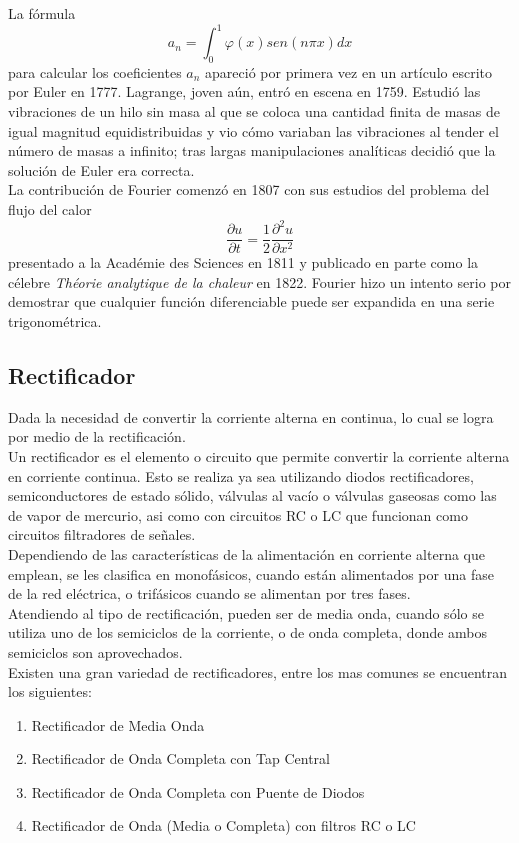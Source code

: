 \documentclass[a4paper,12pt]{article}
\begin{document}
\indent La fórmula
\[ a_n = \int_0^1 \varphi(x)sen\left(n\pi x\right)dx \]
para calcular los coeficientes $a_n$ apareció por primera vez en un artículo escrito por Euler en 1777.
\indent Lagrange, joven aún, entró en escena en 1759. Estudió las vibraciones de un hilo sin masa al que se coloca una cantidad finita de masas de igual magnitud equidistribuidas y vio cómo variaban las vibraciones al tender el
número de masas a infinito; tras largas manipulaciones analíticas decidió que la solución de Euler era correcta.\\
\indent La contribución de Fourier comenzó en 1807 con sus estudios del problema
del flujo del calor
\[ \frac{\partial u}{\partial t} = \frac{1}{2}\frac{\partial^2u}{\partial x^2} \]
presentado a la Académie des Sciences en 1811 y publicado en parte como la célebre \textit{Théorie analytique de la chaleur} en 1822. Fourier hizo un intento serio por demostrar que cualquier función diferenciable puede ser expandida
en una serie trigonométrica.

\subsection{Rectificador}
\indent Dada la necesidad de convertir la corriente alterna en continua, lo cual se logra por medio de la rectificación.\\
\indent Un rectificador es el elemento o circuito que permite convertir la corriente alterna en corriente continua. Esto se realiza ya sea utilizando diodos rectificadores, semiconductores de estado sólido, válvulas al vacío o válvulas gaseosas como las de vapor de mercurio, asi como con circuitos RC o LC que funcionan como circuitos filtradores de señales.\\
\indent Dependiendo de las características de la alimentación en corriente alterna que emplean, se les clasifica en monofásicos, cuando están alimentados por una fase de la red eléctrica, o trifásicos cuando se alimentan por tres fases.\\
\indent Atendiendo al tipo de rectificación, pueden ser de media onda, cuando sólo se utiliza uno de los semiciclos de la corriente, o de onda completa, donde ambos semiciclos son aprovechados.\\

\indent Existen una gran variedad de rectificadores, entre los mas comunes se encuentran los siguientes:
\begin{enumerate}
    \item Rectificador de Media Onda
    \item Rectificador de Onda Completa con Tap Central
    \item Rectificador de Onda Completa con Puente de Diodos
    \item Rectificador de Onda (Media o Completa) con filtros RC o LC
\end{enumerate}
\end{document}
